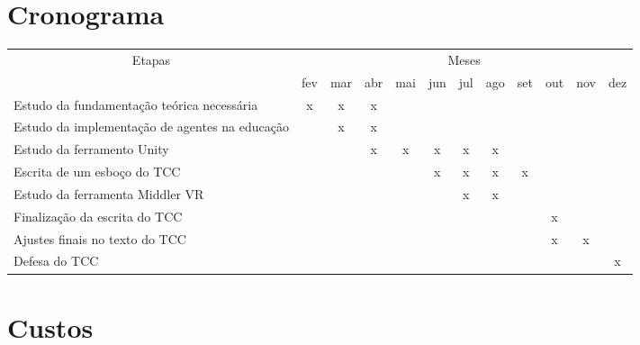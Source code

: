 


\section{Cronograma}

   \begin{tabularx}{\linewidth}{|X|*{11}{c|}}
        \hline
        \multicolumn{1}{|c|}{\multirow{2}{*}{Etapas}} & \multicolumn{11}{|c|}{Meses}\\ \cline{2-12}

        & fev & mar & abr & mai & jun & jul & ago & set & out & nov & dez  \\ \hline

        Estudo da fundamentação teórica necessária
        &  x  &  x  &  x  &     &     &     &     &     &     &     &     \\ \hline

        Estudo da implementação de agentes na educação
        &     &  x  &  x  &     &     &     &     &     &     &     &     \\ \hline

        Estudo da ferramento Unity
        &     &     &  x  &  x  &  x  &  x  &  x  &     &     &     &     \\ \hline

        Escrita de um esboço do TCC
        &     &     &     &     &  x  &  x  &  x  &  x  &     &     &     \\ \hline

       Estudo da ferramenta Middler VR
        &     &     &     &     &     &  x  &  x  &     &     &     &     \\ \hline

        Finalização da escrita do TCC
        &     &     &     &     &     &     &     &     &  x  &     &     \\ \hline

        Ajustes finais no texto do TCC
        &     &     &     &     &     &     &     &     &  x  &  x  &     \\ \hline

        Defesa do TCC
        &     &     &     &     &     &     &     &     &     &     &  x  \\ \hline

    \end{tabularx}



\section{Custos}

